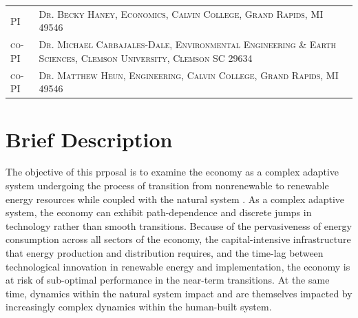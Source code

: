\documentclass[11pt,a4paper]{article}
\begin{document}

\begin{table}
\begin{tabular}{lp{12cm}}
	\textsc{PI} & \textsc{Dr. Becky Haney, Economics, Calvin College, Grand Rapids, MI 49546}	\\
	\textsc{co-PI} & \textsc{Dr. Michael Carbajales-Dale, Environmental Engineering \& Earth Sciences, Clemson University, Clemson SC 29634} \\
	\textsc{co-PI} & \textsc{Dr. Matthew Heun, Engineering, Calvin College, Grand Rapids, MI 49546} \\
\end{tabular}
\end{table}
\section{Brief Description}
The objective of this prposal is to examine the economy as a complex 
adaptive system undergoing the process of transition from nonrenewable to renewable
energy resources while coupled with the natural system . As a complex adaptive system, the economy can exhibit
path-dependence and discrete jumps in technology rather than smooth transitions.
Because of the pervasiveness of energy consumption across
all sectors of the economy, the capital-intensive infrastructure that energy production and distribution
requires, and the time-lag between technological innovation in renewable
energy and implementation, the economy is at risk of sub-optimal
performance in the near-term transitions. At the same time,
dynamics within the natural system impact and are themselves impacted by
increasingly complex dynamics within the human-built system.
\end{document}
